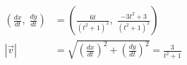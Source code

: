 \documentclass[preview]{standalone}
\begin{document}
\begin{align*}
\left(\frac{dx}{dt}, \; \frac{dy}{dt}\right) &= \left(\frac{6t}{(t^2 +1)^2}, \; \frac{-3t^2 + 3}{(t^2 + 1)^2}\right) \\ |\vec{v}| &= \sqrt{\left(\frac{dx}{dt}\right)^2 + \left(\frac{dy}{dt}\right)^2} =  \frac{3}{t^2 + 1 }
\end{align*}
\end{document}
